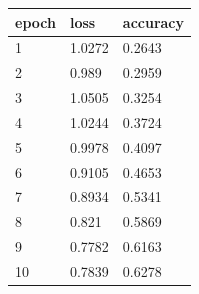 \begin{tabular}{lll}
\hline
epoch & loss & accuracy \\
\hline
1 & 1.0272 & 0.2643 \\
2 & 0.989 & 0.2959 \\
3 & 1.0505 & 0.3254 \\
4 & 1.0244 & 0.3724 \\
5 & 0.9978 & 0.4097 \\
6 & 0.9105 & 0.4653 \\
7 & 0.8934 & 0.5341 \\
8 & 0.821 & 0.5869 \\
9 & 0.7782 & 0.6163 \\
10 & 0.7839 & 0.6278 \\
\hline
\end{tabular}
